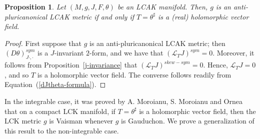 \documentclass[a4paper,11pt]{amsart}
\newtheorem{prop}[thm]{Proposition}
\theoremstyle{definition}
\renewcommand{\[}{\begin{equation*}}
\renewcommand{\]}{\end{equation*}}
\begin{document}
 
 \begin{prop}\label{holomorphic}
Let $(M, g, J, F, \theta)$ be an LCAK manifold. Then, $g$ is an anti-pluricanonical LCAK metric if and only if $T=\theta^\sharp$ is a (real) holomorphic vector field.
 \end{prop}
 \begin{proof}
 
 First suppose that $g$ is an anti-pluricanonical LCAK metric; then $\left(D\theta\right)^{sym}_{J\cdot,\cdot}$ is a $J$-invariant $2$-form, and we have  that $\left(\mathcal{L}_TJ\right)^{sym}=0$. Moreover, it follows from Proposition~\ref{j-invariance} that $\left(\mathcal{L}_TJ\right)^{skew-sym}=0$. Hence, $\mathcal{L}_TJ=0$, and so $T$ is a holomorphic vector field. The converse follows readily from Equation~(\ref{dJtheta-formula}).
 \end{proof}

In the integrable case, it was proved by A. Moroianu, S. Moroianu and Ornea~\cite{MR3830777} that on a compact LCK manifold, if $T=\theta^\sharp$ is a holomorphic vector field, then the LCK metric $g$ is Vaisman whenever $g$ is Gauduchon. We prove a generalization of this result to the non-integrable case.

 

\end{document}
